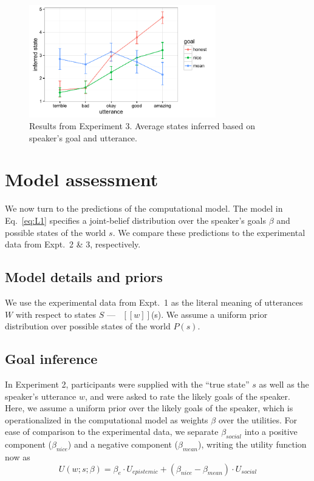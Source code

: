 \documentclass[10pt,letterpaper]{article}
\newcommand{\denote}[1]{\mbox{ $[\![ #1 ]\!]$}}
\begin{document}
\begin{figure}
\begin{centering} 
\includegraphics[width=3.2in]{figures/exp3.pdf}
\caption{\label{fig:exp3} Results from Experiment 3. Average states inferred based on speaker's goal and utterance.}
\end{centering} 
\end{figure}

\section{Model assessment}

We now turn to the predictions of the computational model.
The model in Eq.~\ref{eq:L1} specifies a joint-belief distribution over the speaker's goals $\beta$ and possible states of the world $s$.
We compare these predictions to the experimental data from Expt.~2 \& 3, respectively.

\subsection{Model details and priors}

We use the experimental data from Expt.~1 as the literal meaning of utterances $W$ with respect to states $S$ --- \denote{w}(s).
We assume a uniform prior distribution over possible states of the world $P(s)$. 

\subsection{Goal inference}

In Experiment 2, participants were supplied with the ``true state'' $s$ as well as the speaker's utterance $w$, and were asked to rate the likely goals of the speaker. 
Here, we assume a uniform prior over the likely goals of the speaker, which is operationalized in the computational model as weights $\beta$ over the utilities.
For ease of comparison to the experimental data, we separate $\beta_{social}$ into a positive component ($\beta_{nice}$) and a negative component ($\beta_{mean}$), writing the utility function now as
$$
U(w;s; \beta) = \beta_{e}\cdot U_{epistemic} + (\beta_{nice} - \beta_{mean}) \cdot U_{social}
$$




\setlength{\bibleftmargin}{.125in}
\setlength{\bibindent}{-\bibleftmargin}


\end{document}
